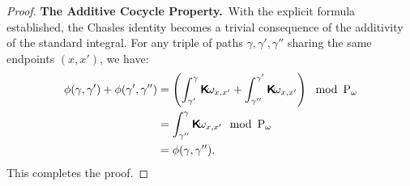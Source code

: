 \documentclass[10pt,reqno,letterpaper,twoside]{amsbook}
\begin{document}
\begin{proof}
    \textbf{The Additive Cocycle Property.}~With the explicit formula established,
    the Chasles identity becomes a trivial consequence of the additivity of the standard integral.
    For any triple of paths $\gamma, \gamma', \gamma''$ sharing the same endpoints $(x,x')$,
    we have:
    \begin{align*}
      \phi(\gamma,\gamma') + \phi(\gamma',\gamma'') &= \left( \int_{\gamma'}^{\gamma} \boldsymbol{\mathsf{K}}\!\omega_{x,x'} + \int_{\gamma''}^{\gamma'} \boldsymbol{\mathsf{K}}\!\omega_{x,x'} \right) \mod {\operatorname{P}_\omega} \\
      &= \int_{\gamma''}^{\gamma} \boldsymbol{\mathsf{K}}\!\omega_{x,x'} \mod {\operatorname{P}_\omega} \\
      &= \phi(\gamma,\gamma'').
    \end{align*}
    This completes the proof.
  \end{proof}
  
\end{document}
